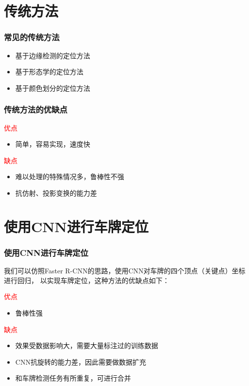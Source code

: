 \documentclass[UTF8]{beamer}
\begin{document}
\section{传统方法}

\begin{frame}
  \frametitle{常见的传统方法}

  \begin{itemize}
    \item 基于边缘检测的定位方法
    \item 基于形态学的定位方法
    \item 基于颜色划分的定位方法
  \end{itemize}
\end{frame}

\begin{frame}
  \frametitle{传统方法的优缺点}

  \textcolor{red}{优点}
  \begin{itemize}
    \item 简单，容易实现，速度快
  \end{itemize}

  \textcolor{red}{缺点}
  \begin{itemize}
    \item 难以处理的特殊情况多，鲁棒性不强
    \item 抗仿射、投影变换的能力差
  \end{itemize}
\end{frame}

\section{使用CNN进行车牌定位}

\begin{frame}
  \frametitle{使用CNN进行车牌定位}

  我们可以仿照Faster R-CNN的思路，使用CNN对车牌的四个顶点（关键点）坐标进行回归，
  以实现车牌定位，这种方法的优缺点如下：

  \textcolor{red}{优点}
  \begin{itemize}
    \item 鲁棒性强
  \end{itemize}

  \textcolor{red}{缺点}
  \begin{itemize}
    \item 效果受数据影响大，需要大量标注过的训练数据
    \item CNN抗旋转的能力差，因此需要做数据扩充
    \item 和车牌检测任务有所重复，可进行合并
  \end{itemize}
\end{frame}
\end{document}
